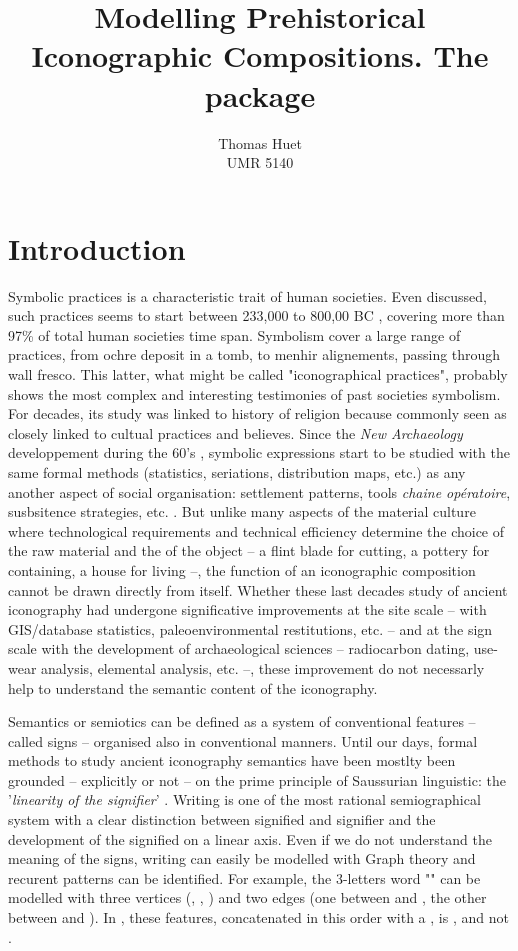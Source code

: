 \documentclass[article]{jss}\usepackage{knitr}
\author{Thomas Huet\\UMR 5140}
\title{Modelling Prehistorical Iconographic Compositions. The \proglang{R} package \pkg{decorr}}
\begin{document}

\section[Introduction]{Introduction} \label{sec:intro}

Symbolic practices is a characteristic trait of human societies. Even discussed, such practices seems to start between 233,000 to 800,00 BC \citep{dErrico00}, covering more than 97\% of total human societies time span. Symbolism cover a large range of practices, from ochre deposit in a tomb, to menhir alignements, passing through wall fresco. This latter, what might be called "iconographical practices", probably shows the most complex and interesting testimonies of past societies symbolism. For decades, its study was linked to history of religion because commonly seen as closely linked to cultual practices and believes. Since the \textit{New Archaeology} developpement during the 60's \citep{Clarke14}, symbolic expressions start to be studied with the same formal methods (statistics, seriations, distribution maps, etc.) as any another aspect of social organisation: settlement patterns, tools \emph{chaine op\'eratoire}, susbsitence strategies, etc. \citep{Renfrew91}. But unlike many aspects of the material culture where technological requirements and technical efficiency determine the choice of the raw material and the of the object -- a flint blade for cutting, a pottery for containing, a house for living --, the function of an iconographic composition cannot be drawn directly from itself. Whether these last decades study of ancient iconography had  undergone significative improvements at the site scale -- with GIS/database statistics, paleoenvironmental restitutions, etc. -- and at the sign scale with the development of archaeological sciences -- radiocarbon dating, use-wear analysis, elemental analysis, etc. --, these improvement do not necessarly help to understand the semantic content of the iconography.

Semantics or semiotics can be defined as a system of conventional features -- called signs -- organised also in conventional manners. Until our days, formal methods to study ancient iconography semantics have been mostlty been grounded  -- explicitly or not -- on the prime principle of Saussurian linguistic: the '\emph{linearity of the signifier}' \citep{Saussure89}.  
Writing is one of the most rational semiographical system with a clear distinction between signified and signifier and the development of the signified on a linear axis. Even if we do not understand the meaning of the signs, writing can easily be modelled with Graph theory and recurent patterns can be identified. For example, the 3-letters word "" can be modelled with three vertices (, , ) and two edges (one between  and , the other between  and ). In , these features, concatenated in this order with a , is , and not .
\end{document}
